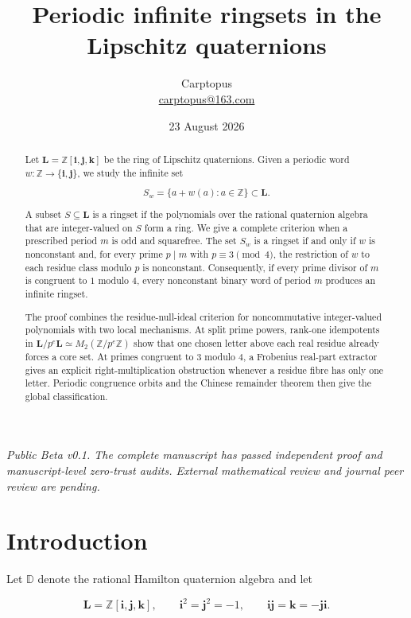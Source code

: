 \documentclass[11pt]{article}
\title{Periodic infinite ringsets in the Lipschitz quaternions}
\author{Carptopus\\\href{mailto:carptopus@163.com}{carptopus@163.com}}
\date{23 August 2026}
\theoremstyle{remark}
\numberwithin{equation}{section}
\begin{document}
\maketitle

\begin{center}
\small\itshape
Public Beta v0.1. The complete manuscript has passed independent proof and
manuscript-level zero-trust audits. External mathematical review and journal
peer review are pending.
\end{center}
\vspace{0.8em}
\begin{abstract}

Let $\mathbf L=\mathbb Z[\mathbf i,\mathbf j,\mathbf k]$ be the ring of
Lipschitz quaternions. Given a periodic word
$w:\mathbb Z\to\{\mathbf i,\mathbf j\}$, we study the infinite set

\[
S_w=\{a+w(a):a\in\mathbb Z\}\subset\mathbf L.
\]

A subset $S\subseteq\mathbf L$ is a ringset if the polynomials over the
rational quaternion algebra that are integer-valued on $S$ form a ring. We
give a complete criterion when a prescribed period $m$ is odd and squarefree.
The set $S_w$ is a ringset if and only if $w$ is nonconstant and, for every
prime $p\mid m$ with $p\equiv3\pmod4$, the restriction of $w$ to each residue
class modulo $p$ is nonconstant. Consequently, if every prime divisor of $m$
is congruent to $1$ modulo $4$, every nonconstant binary word of period $m$
produces an infinite ringset.

The proof combines the residue-null-ideal criterion for noncommutative
integer-valued polynomials with two local mechanisms. At split prime powers,
rank-one idempotents in
$\mathbf L/p^e\mathbf L\simeq M_2(\mathbb Z/p^e\mathbb Z)$ show that one
chosen letter above each real residue already forces a core set. At primes
congruent to $3$ modulo $4$, a Frobenius real-part extractor gives an explicit
right-multiplication obstruction whenever a residue fibre has only one
letter. Periodic congruence orbits and the Chinese remainder theorem then
give the global classification.

\end{abstract}
\section{Introduction}

Let $\mathbb D$ denote the rational Hamilton quaternion algebra and let

\[
\mathbf L
=\mathbb Z[\mathbf i,\mathbf j,\mathbf k],
\qquad
\mathbf i^2=\mathbf j^2=-1,
\qquad
\mathbf i\mathbf j=\mathbf k=-\mathbf j\mathbf i.
\]
\end{document}
